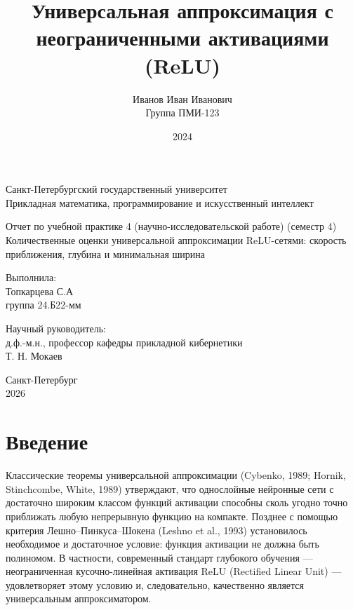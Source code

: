 \documentclass[12pt]{article}
\title{Универсальная аппроксимация с неограниченными активациями (ReLU)}
\author{Иванов Иван Иванович \\ Группа ПМИ-123}
\date{2024}
\begin{document}
	
	\begin{titlepage}
		\centering
		
		Санкт-Петербургский государственный университет \\
		Прикладная математика, программирование и искусственный интеллект \\
		
		\vspace{4cm}
		
		Отчет по учебной практике 4 (научно-исследовательской работе) (семестр 4) \\
		Количественные оценки универсальной
		аппроксимации ReLU-сетями:
		скорость приближения, глубина и минимальная ширина \\
		
		\vspace{4cm}
		
		\begin{flushright}
			Выполнила: \\
			Топкарцева С.А \\
			группа 24.Б22-мм \\
			
			\vspace{1cm}
			
			Научный руководитель: \\
			д.ф.-м.н., профессор кафедры прикладной кибернетики \\
			Т. Н. Мокаев \\
		\end{flushright}
		
		\vspace{4cm} 
		
		
		
		\vfill
		
		Санкт-Петербург \\
		2026
	\end{titlepage}
	
	\tableofcontents
	\newpage
	
	\section*{Введение}
	
	Классические теоремы универсальной аппроксимации (Cybenko, 1989; Hornik,
	Stinchcombe, White, 1989) утверждают, что однослойные нейронные сети с достаточно широким классом функций активации способны сколь угодно точно приближать любую непрерывную функцию на компакте. Позднее с помощью критерия Лешно–Пинкуса–Шокена (Leshno et al., 1993) установилось необходимое и достаточное условие: функция активации не должна быть полиномом. В частности, современный стандарт глубокого обучения — неограниченная кусочно-линейная активация ReLU (Rectified Linear Unit) — удовлетворяет этому условию и, следовательно, качественно является универсальным аппроксиматором.
	
\end{document}
